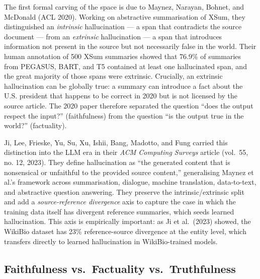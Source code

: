 The first formal carving of the space is due to Maynez, Narayan, Bohnet, and McDonald (ACL 2020). Working on abstractive summarisation of XSum, they distinguished an \emph{intrinsic} hallucination --- a span that contradicts the source document --- from an \emph{extrinsic} hallucination --- a span that introduces information not present in the source but not necessarily false in the world. Their human annotation of 500 XSum summaries showed that 76.9\% of summaries from PEGASUS, BART, and T5 contained at least one hallucinated span, and the great majority of those spans were extrinsic. Crucially, an extrinsic hallucination can be globally true: a summary can introduce a fact about the U.S. president that happens to be correct in 2020 but is not licensed by the source article. The 2020 paper therefore separated the question ``does the output respect the input?'' (faithfulness) from the question ``is the output true in the world?'' (factuality).

Ji, Lee, Frieske, Yu, Su, Xu, Ishii, Bang, Madotto, and Fung carried this distinction into the LLM era in their \emph{ACM Computing Surveys} article (vol.~55, no. 12, 2023). They define hallucination as ``the generated content that is nonsensical or unfaithful to the provided source content,'' generalising Maynez et al.'s framework across summarisation, dialogue, machine translation, data-to-text, and abstractive question answering. They preserve the intrinsic/extrinsic split and add a \emph{source-reference divergence} axis to capture the case in which the training data itself has divergent reference summaries, which seeds learned hallucination. This axis is empirically important: as Ji et al.~(2023) showed, the WikiBio dataset has 23\% reference-source divergence at the entity level, which transfers directly to learned hallucination in WikiBio-trained models.

\subsection{Faithfulness vs.~Factuality vs.~Truthfulness}\label{faithfulness-vs.-factuality-vs.-truthfulness}

